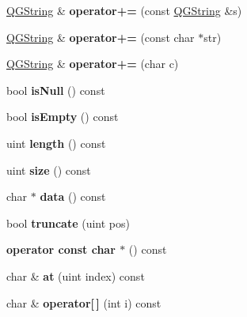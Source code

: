 \begin{DoxyCompactItemize}
\item 
\mbox{\label{class_q_g_string_a34f9c345f72d6d97db605eee76d038da}} 
\mbox{\hyperlink{class_q_g_string}{Q\+G\+String}} \& {\bfseries operator+=} (const \mbox{\hyperlink{class_q_g_string}{Q\+G\+String}} \&s)
\item 
\mbox{\label{class_q_g_string_a7268b8f2811a4cc43a3a1e7a585af1c8}} 
\mbox{\hyperlink{class_q_g_string}{Q\+G\+String}} \& {\bfseries operator+=} (const char $\ast$str)
\item 
\mbox{\label{class_q_g_string_a8b96e7d6a99e481543294c2a0dd373d3}} 
\mbox{\hyperlink{class_q_g_string}{Q\+G\+String}} \& {\bfseries operator+=} (char c)
\item 
\mbox{\label{class_q_g_string_a9261b5a52bac741d4c83a0d9ebfd0d6d}} 
bool {\bfseries is\+Null} () const
\item 
\mbox{\label{class_q_g_string_a1fef86f81795c500e97314ad074b7b13}} 
bool {\bfseries is\+Empty} () const
\item 
\mbox{\label{class_q_g_string_ad927b768b9204b01c045326cdd8cb363}} 
uint {\bfseries length} () const
\item 
\mbox{\label{class_q_g_string_a011d0e9db6cf9831f00c817b5d16a963}} 
uint {\bfseries size} () const
\item 
\mbox{\label{class_q_g_string_a2474747b7a0a4de99aee41de660eaab5}} 
char $\ast$ {\bfseries data} () const
\item 
\mbox{\label{class_q_g_string_a9f35cff72d32aafbb2e08bd0ac59765d}} 
bool {\bfseries truncate} (uint pos)
\item 
\mbox{\label{class_q_g_string_a15a1d9a0d88c899a1403545dd5d0a63a}} 
{\bfseries operator const char $\ast$} () const
\item 
\mbox{\label{class_q_g_string_a448c5f438c783f7d18059d559991821e}} 
char \& {\bfseries at} (uint index) const
\item 
\mbox{\label{class_q_g_string_aa540d6693fac0b4a58880ba200565168}} 
char \& {\bfseries operator\mbox{[}$\,$\mbox{]}} (int i) const
\end{DoxyCompactItemize}


